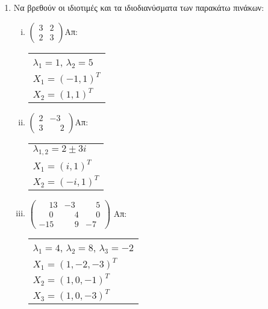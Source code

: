 



\pagestyle{askhseis}




\begin{center}
  \minibox{\large\bfseries \textcolor{Col1}{Ασκήσεις στις Ιδιοτιμές-Ιδιοδιανύσματα
  Πίνακα}}
\end{center}

\vspace{\baselineskip}

\begin{enumerate}

\item Να βρεθούν οι ιδιοτιμές και τα ιδιοδιανύσματα των παρακάτω πινάκων:

\begin{enumerate}[i)]

\item $\begin{pmatrix}
3 & 2 \\
2 & 3
\end{pmatrix}$\hfill Απ: \begin{tabular}{l}
$\lambda_1=1$, $\lambda_2=5$ \\
$X_1=(-1,1)^T$ \\
$X_2=(1,1)^T$
\end{tabular}

\item $\begin{pmatrix}
2 & -3 \\
3 & \phantom{-}2
\end{pmatrix}$\hfill Απ: \begin{tabular}{l}
$\lambda_{1,2}=2\pm 3i$ \\
$X_1=(i,1)^T$ \\
$X_2=(-i,1)^T$
\end{tabular}

\item $\begin{pmatrix}
\phantom{-}13 & -3 & \phantom{-}5 \\
\phantom{-}0 & \phantom{-}4 & \phantom{-}0 \\
-15 & \phantom{-}9 & -7
\end{pmatrix}$ \hfill Απ: \begin{tabular}{l}
$\lambda_1=4$, $\lambda_2=8$, $\lambda_3=-2$ \\ 
$X_1=(1,-2,-3)^T$ \\
$X_2=(1,0,-1)^T$ \\
$X_3=(1,0,-3)^T$
\end{tabular}


\end{enumerate}
\end{enumerate}
